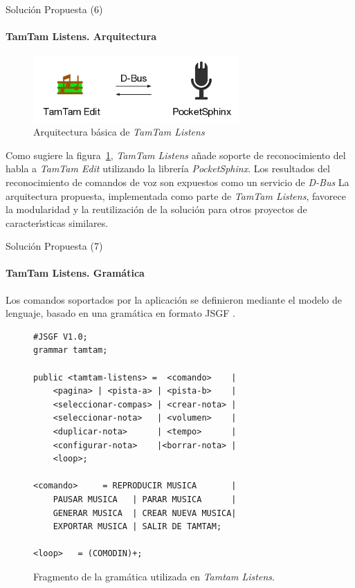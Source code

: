 \begin{frame}{Soluci\'on Propuesta (6)}
\framesubtitle{TamTam Listens. Arquitectura}

\begin{figure}[H] 
\centering
\includegraphics[width=0.7\textwidth]{./graphics/tamtam-listens-arq.png}
\caption{Arquitectura b\'asica de \emph{TamTam Listens}}
\label{figure:tamtam-listens-arq}
\end{figure}

Como sugiere la figura~\ref{figure:tamtam-listens-arq}, \emph{TamTam Listens} a\~nade soporte de 
reconocimiento del habla a \emph{TamTam Edit} utilizando la librer\'ia \emph{PocketSphinx}. 
Los resultados del reconocimiento de comandos de voz son expuestos como 
un  servicio de \emph{D-Bus}\cite{Dbus2013}
La arquitectura propuesta, implementada como parte de \emph{TamTam Listens}, favorece la modularidad
y la reutilizaci\'on de la soluci\'on para otros proyectos de caracter{\'\i}sticas similares.
\end{frame}

\begin{frame}[fragile]{Soluci\'on Propuesta (7)}
\framesubtitle{TamTam Listens. Gram\'atica}
Los comandos soportados por la aplicación se definieron mediante el modelo de lenguaje, basado
en una gram\'atica en formato JSGF \cite{JSGF2000}. 

\begin{figure}[H]
\begin{lstlisting}[frame=single]
#JSGF V1.0;
grammar tamtam;

public <tamtam-listens> =  <comando>    |
    <pagina> | <pista-a> | <pista-b>    | 
    <seleccionar-compas> | <crear-nota> |
    <seleccionar-nota>   | <volumen>    |
    <duplicar-nota>      | <tempo>      | 
    <configurar-nota>    |<borrar-nota> |
    <loop>;

<comando>     = REPRODUCIR MUSICA       |
    PAUSAR MUSICA   | PARAR MUSICA      | 
    GENERAR MUSICA  | CREAR NUEVA MUSICA| 
    EXPORTAR MUSICA | SALIR DE TAMTAM;

<loop>   = (COMODIN)+;
\end{lstlisting}
\caption{Fragmento de la gram\'atica utilizada en \emph{Tamtam Listens}.}
\label{figure:fragmento-gram}
\end{figure}
\end{frame}

